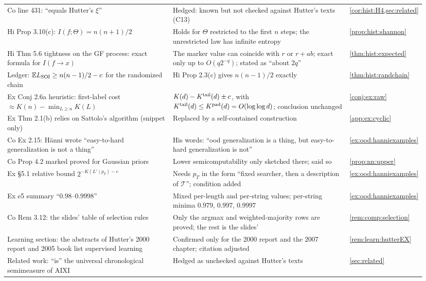 {\begin{longtable}{@{}>{\raggedright\arraybackslash}p{5.1cm}>{\raggedright\arraybackslash}p{7.6cm}>{\raggedright\arraybackslash}p{2.6cm}@{}}
Co line 431: \SFIhist{} ``equals Hutter's $\xi$'' & Hedged: known but not checked against Hutter's texts (C13) & \cref{cor:hist:H4,sec:related}\\
Hi Prop 3.10(c): $I(f;\Theta)=n(n+1)/2$ & Holds for $\Theta$ restricted to the first $n$ steps; the unrestricted law has infinite entropy & \cref{prop:hist:shannon}\\
Hi Thm 5.6 tightness on the GF process: exact formula for $I(f\to x)$ & The marker value can coincide with $r$ or $r+ab$; exact only up to $O(q2^{-q})$; stated as ``about $2q$'' & \cref{thm:hist:expected}\\
Ledger: $\mathbb{E}L_{\mathrm{SOI}}\ge n(n-1)/2-c$ for the randomized chain & Hi Prop 2.3(c) gives $n(n-1)/2$ exactly & \cref{thm:hist:randchain}\\
Ex Conj 2.6a heuristic: first-label cost $\approx K(n)-\min_{L\ge n}K(L)$ & $K(d)-K^{\mathrm{tail}}(d)\pm c$, with $K^{\mathrm{tail}}(d)\le K^{\mathrm{pad}}(d)=O(\log\log d)$; conclusion unchanged & \cref{conj:ex:raw}\\
Ex Thm 2.1(b) relies on Sattolo's algorithm (snippet only) & Replaced by a self-contained construction & \cref{app:ex:cyclic}\\
Co Ex 2.15: H\"anni wrote ``easy-to-hard generalization is not a thing'' & His words: ``ood generalization is a thing, but easy-to-hard generalization is not'' & \cref{ex:ood:hanniexamples}\\
Co Prop 4.2 marked proved for Gaussian priors & Lower semicomputability only sketched there; said so & \cref{prop:nn:upper}\\
Ex \S5.1 relative bound $2^{-K(L'\mid p_T)-c}$ & Needs $p_T$ in the form ``fixed searcher, then a description of $\mathcal T$''; condition added & \cref{ex:ood:hanniexamples}\\
Ex e5 summary ``$0.98$--$0.9998$'' & Mixed per-length and per-string values; per-string minima $0.979$, $0.997$, $0.9997$ & \cref{ex:ood:hanniexamples}\\
Co Rem 3.12: the slides' table of selection rules & Only the argmax and weighted-majority rows are proved; the rest is the slides' & \cref{rem:comp:selection}\\
Learning section: the abstracts of Hutter's 2000 report and 2005 book list supervised learning & Confirmed only for the 2000 report and the 2007 chapter; citation adjusted & \cref{rem:learn:hutterEX}\\
Related work: \SFIhist{} ``is'' the universal chronological semimeasure of AIXI & Hedged as unchecked against Hutter's texts & \cref{sec:related}\\
\end{longtable}}

